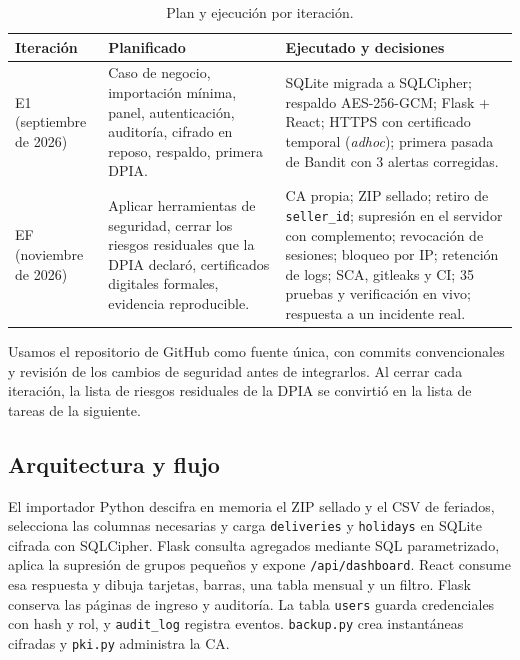 \documentclass[12pt,a4paper]{article}
\begin{document}
\begin{table}[H]
\centering\footnotesize
\begin{tabularx}{\textwidth}{P{2.4cm}Y Y}
\toprule
Iteración & Planificado & Ejecutado y decisiones\\
\midrule
E1 (septiembre de 2026) & Caso de negocio, importación mínima, panel, autenticación, auditoría, cifrado en reposo, respaldo, primera DPIA. & SQLite migrada a SQLCipher; respaldo AES-256-GCM; Flask + React; HTTPS con certificado temporal (\emph{adhoc}); primera pasada de Bandit con 3 alertas corregidas.\\
EF (noviembre de 2026) & Aplicar herramientas de seguridad, cerrar los riesgos residuales que la DPIA declaró, certificados digitales formales, evidencia reproducible. & CA propia; ZIP sellado; retiro de \texttt{seller\_id}; supresión en el servidor con complemento; revocación de sesiones; bloqueo por IP; retención de logs; SCA, gitleaks y CI; 35 pruebas y verificación en vivo; respuesta a un incidente real.\\
\bottomrule
\end{tabularx}
\caption{Plan y ejecución por iteración.}
\end{table}

Usamos el repositorio de GitHub como fuente única, con commits convencionales y revisión de los cambios de seguridad antes de integrarlos. Al cerrar cada iteración, la lista de riesgos residuales de la DPIA se convirtió en la lista de tareas de la siguiente.

\subsection{Arquitectura y flujo}
El importador Python descifra en memoria el ZIP sellado y el CSV de feriados, selecciona las columnas necesarias y carga \texttt{deliveries} y \texttt{holidays} en SQLite cifrada con SQLCipher. Flask consulta agregados mediante SQL parametrizado, aplica la supresión de grupos pequeños y expone \texttt{/api/dashboard}. React consume esa respuesta y dibuja tarjetas, barras, una tabla mensual y un filtro. Flask conserva las páginas de ingreso y auditoría. La tabla \texttt{users} guarda credenciales con hash y rol, y \texttt{audit\_log} registra eventos. \texttt{backup.py} crea instantáneas cifradas y \texttt{pki.py} administra la CA.

\begin{center}
\end{center}
\end{document}

